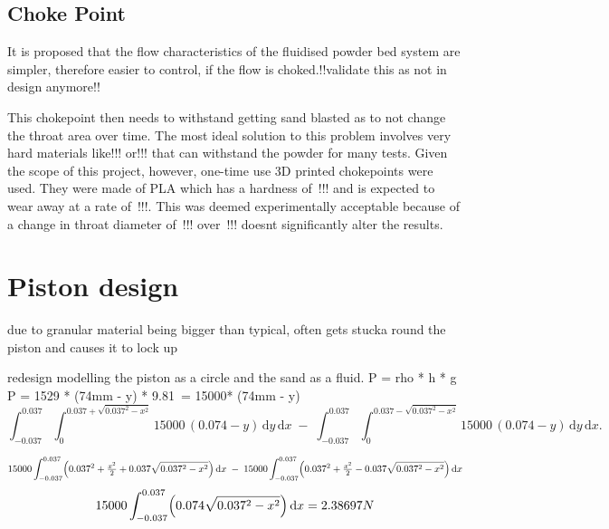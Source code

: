 \subsection{Choke Point}
It is proposed that the flow characteristics of the fluidised powder bed system are simpler, therefore easier to control, if the flow is choked.!!validate this as not in design anymore!!


This chokepoint then needs to withstand getting sand blasted as to not change the throat area over time. The most ideal solution to this problem involves very hard materials like!!! or!!! that can withstand the powder for many tests. Given the scope of this project, however, one-time use 3D printed chokepoints were used. They were made of PLA which has a hardness of~!!! and is expected to wear away at a rate of~!!!. This was deemed experimentally acceptable because of a change in throat diameter of~!!! over~!!! doesnt significantly alter the results.


\section{Piston design}
due to granular material being bigger than typical, often gets stucka round the piston and causes it to lock up

redesign
modelling the piston as a circle and the sand as a fluid. 
P = rho * h * g
P = 1529 * (74mm - y) * 9.81~= 15000* (74mm - y)
\begin{equation}
    \int_{-0.037}^{0.037}\!\int_{0}^{0.037+\sqrt{0.037^2 - x^2}}15000\,(0.074 - y)\,\mathrm{d}y\,\mathrm{d}x
    \;-\;
    \int_{-0.037}^{0.037}\!\int_{0}^{0.037-\sqrt{0.037^2 - x^2}}15000\,(0.074 - y)\,\mathrm{d}y\,\mathrm{d}x.
\end{equation}

\begin{equation}
    15000\int_{-0.037}^{0.037}\Bigl(0.037^2 + \tfrac{x^2}{2} + 0.037\sqrt{0.037^2 - x^2}\Bigr)\,\mathrm{d}x
    \;-\;
    15000\int_{-0.037}^{0.037}\Bigl(0.037^2 + \tfrac{x^2}{2} - 0.037\sqrt{0.037^2 - x^2}\Bigr)\,\mathrm{d}x
\end{equation}
\begin{equation}
    15000\int_{-0.037}^{0.037}\Bigl(0.074\sqrt{0.037^2 - x^2}\Bigr)\,\mathrm{d}x = 2.38697N
\end{equation}

